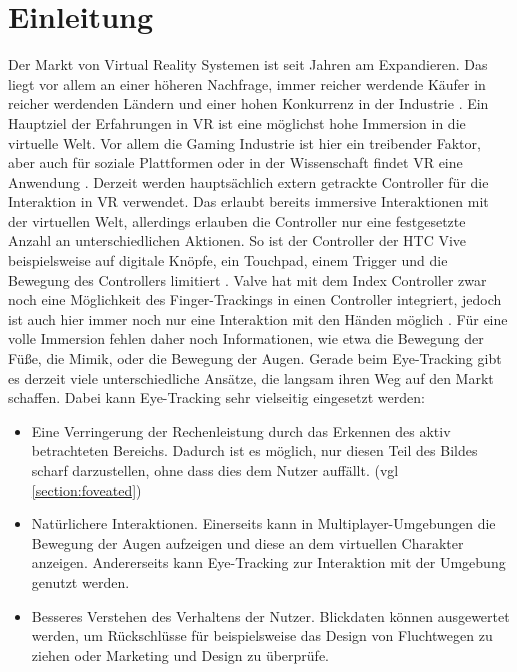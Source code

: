 \chapter{Einleitung}
Der Markt von Virtual Reality Systemen ist seit Jahren am Expandieren. Das liegt vor allem an einer höheren Nachfrage, immer reicher werdende Käufer in reicher werdenden Ländern und einer hohen Konkurrenz in der Industrie \cite{grandview.2020}. Ein Hauptziel der Erfahrungen in \ac{VR} ist eine möglichst hohe Immersion in die virtuelle Welt. Vor allem die Gaming Industrie ist hier ein treibender Faktor, aber auch für soziale Plattformen oder in der Wissenschaft findet \ac{VR} eine Anwendung \cite{grandview.2020}. Derzeit werden hauptsächlich extern getrackte Controller für die Interaktion in \ac{VR} verwendet. Das erlaubt bereits immersive Interaktionen mit der virtuellen Welt, allerdings erlauben die Controller nur eine festgesetzte Anzahl an unterschiedlichen Aktionen. So ist der Controller der HTC Vive beispielsweise auf digitale Knöpfe, ein Touchpad, einem Trigger und die Bewegung des Controllers limitiert \cite{ViveProduct}. Valve hat mit dem Index Controller zwar noch eine Möglichkeit des Finger-Trackings in einen Controller integriert, jedoch ist auch hier immer noch nur eine Interaktion mit den Händen möglich \cite{Index.Controller}. Für eine volle Immersion fehlen daher noch Informationen, wie etwa die Bewegung der Füße, die Mimik, oder die Bewegung der Augen. Gerade beim Eye-Tracking gibt es derzeit viele unterschiedliche Ansätze, die langsam ihren Weg auf den Markt schaffen. Dabei kann Eye-Tracking sehr vielseitig eingesetzt werden:
\begin{itemize}
	\item Eine Verringerung der Rechenleistung durch das Erkennen des aktiv betrachteten Bereichs. Dadurch ist es möglich, nur diesen Teil des Bildes scharf darzustellen, ohne dass dies dem Nutzer auffällt. \cite{Rogers.2019} (vgl \autoref{section:foveated})
	\item Natürlichere Interaktionen. Einerseits kann in Multiplayer-Umgebungen die Bewegung der Augen aufzeigen und diese an dem virtuellen Charakter anzeigen. Andererseits kann Eye-Tracking zur Interaktion mit der Umgebung genutzt werden.\cite{Rogers.2019} 
	\item Besseres Verstehen des Verhaltens der Nutzer. Blickdaten können ausgewertet werden, um Rückschlüsse für beispielsweise das Design von Fluchtwegen zu ziehen oder Marketing und Design zu überprüfe. \cite{Rogers.2019}
\end{itemize}

